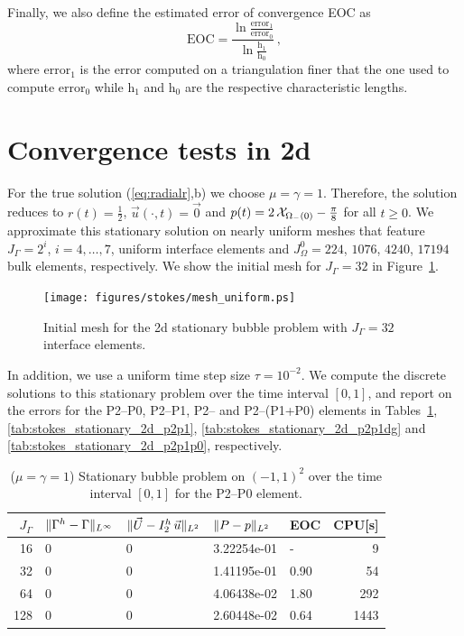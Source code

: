 Finally, we also define the estimated error of convergence EOC as
\begin{equation} \label{eq:eoc}
\mbox{EOC}=\frac{\ln{\frac{\mbox{error}_1}{\mbox{error}_0}}}
{\ln{\frac{\mbox{h}_1}{\mbox{h}_0}}}\,,
\end{equation}
where $\mbox{error}_1$ is the error computed on a triangulation finer that the
one used to compute $\mbox{error}_0$ while $\mbox{h}_1$ and $\mbox{h}_0$ are the
respective characteristic lengths.

\section{Convergence tests in 2d}\label{sec:stokes_2d_convergence_results}
For the true solution (\ref{eq:radialr},b) we choose $\mu = \gamma = 1$.
Therefore, the solution reduces to $r(t) =
\frac{1}{2}$, $\vec u(\cdot, t) = \vec 0$ and $p(t) = 2\,\mathrm{\mathcal{X}}_{\Omega_-(0)} -
\frac{\pi}{8}$ for all $t \geq 0$. We approximate this stationary solution on
nearly uniform meshes that feature $J_\Gamma = 2^i$, $i=4,\ldots,7$, uniform
interface elements and $J_\Omega^0 = 224$, $1076$, $4240$, $17194$ bulk
elements, respectively. We show the initial mesh for $J_\Gamma = 32$ in
Figure~\ref{fig:meshes_uniform}.
\begin{figure}[htbp]
\centering
\texttt{[image: figures/stokes/mesh\_uniform.ps]}
\caption[Stokes 2d stationary bubble initial mesh]
{Initial mesh for the 2d stationary bubble problem with $J_\Gamma = 32$
interface elements.}
\label{fig:meshes_uniform}
\end{figure}
In addition, we use a uniform time step size $\tau=10^{-2}$.
We compute the discrete solutions to this stationary problem over the time
interval $[0,1]$, and report on the errors for the P2--P0, P2--P1, P2--\pdg
and P2--(P1+P0) elements in Tables~\ref{tab:stokes_stationary_2d_p2p0},
\ref{tab:stokes_stationary_2d_p2p1}, \ref{tab:stokes_stationary_2d_p2p1dg} and
\ref{tab:stokes_stationary_2d_p2p1p0}, respectively.
\begin{table}
\center
\begin{tabular}{rllllr}
\hline
$J_\Gamma$ & $\|\Gamma^h - \Gamma\|_{L^\infty}$ & $\|\vec U - I^h_{2}\,\vec u\|_{L^2}$ & $\|P - p\|_{L^2}$ & EOC & CPU[s] \\
\hline
 16 & 0 & 0 & 3.22254e-01 &    - &    9 \\
 32 & 0 & 0 & 1.41195e-01 & 0.90 &   54 \\
 64 & 0 & 0 & 4.06438e-02 & 1.80 &  292 \\
128 & 0 & 0 & 2.60448e-02 & 0.64 & 1443 \\
\hline
\end{tabular}
\caption[Stokes 2d stationary bubble errors P2--P0]
{($\mu=\gamma=1$) Stationary bubble problem on $(-1,1)^2$ over the time
interval $[0,1]$ for the P2--P0 element.}
\label{tab:stokes_stationary_2d_p2p0}
\end{table}
